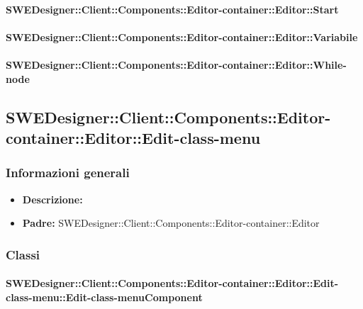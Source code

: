 			\paragraph{SWEDesigner::Client::Components::Editor-container::Editor::Start}
				
				
			\paragraph{SWEDesigner::Client::Components::Editor-container::Editor::Variabile}
				
				
			\paragraph{SWEDesigner::Client::Components::Editor-container::Editor::While-node}
				
				
	\subsection{SWEDesigner::Client::Components::Editor-container::Editor::Edit-class-menu}
		\subsubsection{Informazioni generali}
			\begin{itemize}
          		\item \textbf{Descrizione:}\\
          		
          		\item \textbf{Padre:} SWEDesigner::Client::Components::Editor-container::Editor
          	\end{itemize}

         \subsubsection{Classi}
         
         	\paragraph{SWEDesigner::Client::Components::Editor-container::Editor::Edit-class-menu::Edit-class-menuComponent}
				
				
